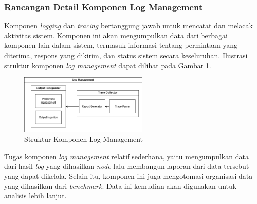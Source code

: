\subsubsection{Rancangan Detail Komponen Log Management}
\label{subsubsection:detail-data-log-management}

Komponen \textit{logging} dan \textit{tracing} bertanggung jawab untuk mencatat dan melacak aktivitas sistem. Komponen ini akan mengumpulkan data dari berbagai komponen lain dalam sistem, termasuk informasi tentang permintaan yang diterima, respons yang dikirim, dan status sistem secara keseluruhan. Ilustrasi struktur komponen \textit{log management} dapat dilihat pada Gambar \ref{fig:log-management-structure}.

\begin{figure}[ht]
	\centering
	\includegraphics[width=0.55\textwidth]{resources/chapter-3/log-management-architecture.png}
	\caption{Struktur Komponen Log Management}
	\label{fig:log-management-structure}
\end{figure}

Tugas komponen \textit{log management} relatif sederhana, yaitu mengumpulkan data dari hasil \textit{log} yang dihasilkan \textit{node} lalu membangun laporan dari data tersebut yang dapat dikelola. Selain itu, komponen ini juga mengotomasi organisasi data yang dihasilkan dari \textit{benchmark}. Data ini kemudian akan digunakan untuk analisis lebih lanjut.
